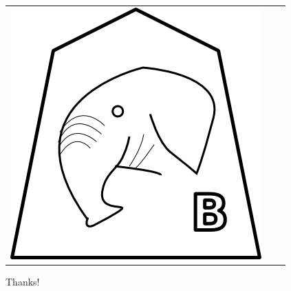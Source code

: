 \documentclass{beamer}
\begin{document}
\begin{frame}
\begin{center}
\begin{tabular}{ccc}
\includegraphics[scale = 0.2]{../../graphics/Bishop.png}\\
\end{tabular}
\vspace{0.5in}

Thanks!
\end{center}
\end{frame}
\end{document}

